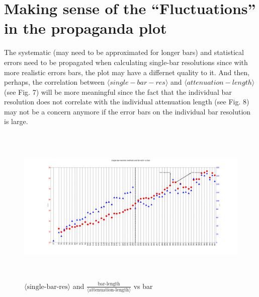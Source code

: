 \documentclass[12pt]{article}
\begin{document}
\clearpage

\section {Making sense of the ``Fluctuations'' in the propaganda plot}
The systematic (may need to be approximated for longer bars) and statistical errors need to be propagated when calculating single-bar resolutions since with more realistic errors bars, the plot may have a differnet quality to it. And then, perhaps, the correlation between $\langle single-bar-res \rangle$ and $\langle attenuation -length \rangle$ (see Fig. 7) will be more meaningful since the fact that the individual bar resolution does not correlate with the individual attenuation length (see Fig. 8) may not be a concern anymore if the error bars on the individual bar resolution is large.

\begin{figure}[ht]
	\includegraphics[height=3in,width=5in]{avg-res_avg-atl_vs_length-2.pdf}
	\caption{$\langle \text{single-bar-res} \rangle$ and  $\frac{\text{bar-length}}{\langle \text{attenuation-length} \rangle}$ vs bar}
	\label{fig7}
\end{figure}
\end{document}
